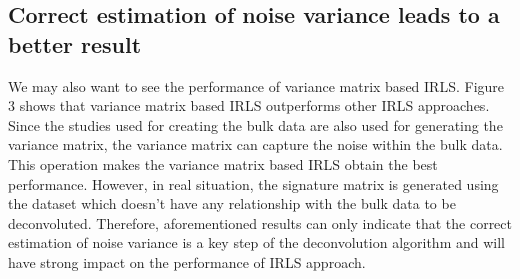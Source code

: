 \documentclass[10pt, a4paper, oneside]{article}
\begin{document}
\subsection{Correct estimation of noise variance leads to a better result}
\justify
We may also want to see the performance of variance matrix based IRLS. Figure 3 shows that variance matrix based IRLS outperforms
other IRLS approaches. Since the studies used for creating the bulk data are also used for generating the variance matrix, the variance matrix can capture the noise within the bulk data. This operation makes the variance matrix based IRLS obtain the 
best performance. However, in real situation, the signature matrix is generated using the dataset which doesn't have any relationship with the bulk data to be deconvoluted.
Therefore, aforementioned results can only indicate that the correct estimation of noise variance is a key step of the deconvolution algorithm and will have strong impact on the performance of IRLS approach.
\end{document}
